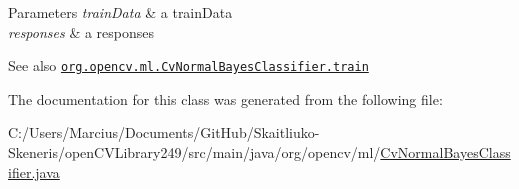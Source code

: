\begin{DoxyParams}{Parameters}
{\em train\+Data} & a train\+Data \\
\hline
{\em responses} & a responses\\
\hline
\end{DoxyParams}
\begin{DoxySeeAlso}{See also}
\href{http://docs.opencv.org/modules/ml/doc/normal_bayes_classifier.html#cvnormalbayesclassifier-train}{\tt org.\+opencv.\+ml.\+Cv\+Normal\+Bayes\+Classifier.\+train} 
\end{DoxySeeAlso}


The documentation for this class was generated from the following file\+:\begin{DoxyCompactItemize}
\item 
C\+:/\+Users/\+Marcius/\+Documents/\+Git\+Hub/\+Skaitliuko-\/\+Skeneris/open\+C\+V\+Library249/src/main/java/org/opencv/ml/\mbox{\hyperlink{_cv_normal_bayes_classifier_8java}{Cv\+Normal\+Bayes\+Classifier.\+java}}\end{DoxyCompactItemize}
